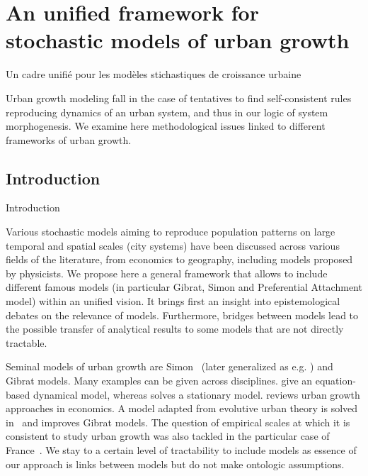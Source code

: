 


\newpage

\section{An unified framework for stochastic models of urban growth}{Un cadre unifié pour les modèles stichastiques de croissance urbaine}

Urban growth modeling fall in the case of tentatives to find self-consistent rules reproducing dynamics of an urban system, and thus in our logic of system morphogenesis. We examine here methodological issues linked to different frameworks of urban growth.

\subsection{Introduction}{Introduction}

Various stochastic models aiming to reproduce population patterns on large temporal and spatial scales (city systems) have been discussed across various fields of the literature, from economics to geography, including models proposed by physicists. We propose here a general framework that allows to include different famous models (in particular Gibrat, Simon and Preferential Attachment model) within an unified vision. It brings first an insight into epistemological debates on the relevance of models. Furthermore, bridges between models lead to the possible transfer of analytical results to some models that are not directly tractable.


Seminal models of urban growth are Simon~\cite{simon1955class} (later generalized as e.g. \cite{haran1973modified}) and Gibrat models. Many examples can be given across disciplines. \cite{benguigui2007dynamic} give an equation-based dynamical model, whereas \cite{gabaix1999zipf} solves a stationary model. \cite{Gabaix20042341} reviews urban growth approaches in economics. A model adapted from evolutive urban theory is solved in~\cite{favaro2011gibrat} and improves Gibrat models. The question of empirical scales at which it is consistent to study urban growth was also tackled in the particular case of France~\cite{bretagnolle2002time}. We stay to a certain level of tractability to include models as essence of our approach is links between models but do not make ontologic assumptions.




